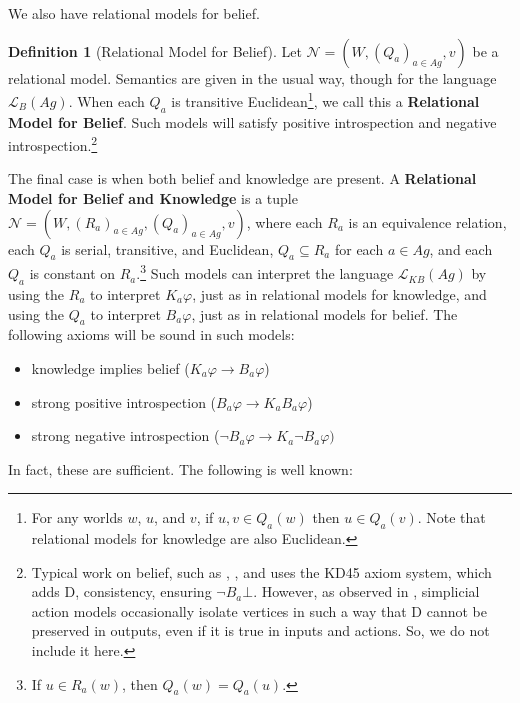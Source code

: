 \documentclass[11pt]{article}
\theoremstyle{definition}
\newtheorem{definition}{Definition}[section]
\newcommand{\defin}[1]{\textbf{#1}}
\renewcommand{\phi}{\varphi}
\newcommand{\lthen}{\rightarrow}
\renewcommand{\L}{\mathcal{L}}
\newcommand{\N}{\mathcal{N}}
\begin{document}
	We also have relational models for belief.
	
		\begin{definition}[Relational Model for Belief] Let $\N = (W,(Q_{a})_{a \in Ag},v)$ be a relational model. Semantics are given in the usual way, though for the language $\L_{B}(Ag)$. When each $Q_a$ is transitive Euclidean\footnote{For any worlds $w$, $u$, and $v$, if $u,v\in Q_a(w)$ then $u\in Q_a(v)$. Note that relational models for knowledge are also Euclidean.}, we call this a \defin{Relational Model for Belief}. Such models will satisfy positive introspection and negative introspection.\footnote{Typical work on belief, such as \cite{HGD}, \cite{SimpBel}, and \cite{BelSimp} uses the \textsf{KD45} axiom system, which adds \textsf{D}, consistency, ensuring $\neg B_a\bot$. However, as observed in \cite{SimpBelRev}, simplicial action models occasionally isolate vertices in such a way that \textsf{D} cannot be preserved in outputs, even if it is true in inputs and actions. So, we do not include it here.}
	\end{definition}

	The final case is when both belief and knowledge are present. A \defin{Relational Model for Belief and Knowledge} is a tuple $\N=(W,(R_{a})_{a \in Ag},(Q_{a})_{a \in Ag},v)$, where each $R_a$ is an equivalence relation, each $Q_a$ is serial, transitive, and Euclidean, $Q_a\subseteq R_a$ for each $a\in Ag$, and each $Q_a$ is constant on $R_a$.\footnote{If $u\in R_a(w)$, then $Q_a(w)=Q_a(u)$.} Such models can interpret the language $\L_{KB}(Ag)$ by using the $R_a$ to interpret $K_a\varphi$, just as in relational models for knowledge, and using the $Q_a$ to interpret $B_a\varphi$, just as in relational models for belief. The following axioms will be sound in such models:
	
	\begin{itemize}
	\item knowledge implies belief ($K_{a} \phi \lthen B_{a} \phi$)
	\item strong positive introspection ($B_{a} \phi \lthen K_{a} B_{a} \phi$)
	\item strong negative introspection ($\lnot B_{a} \phi \lthen K_{a} \lnot B_{a} \phi)$
	\end{itemize}

	In fact, these are sufficient. The following is well known: \cite{DC5, BelSimp,Bjorndahl2024}
	
\end{document}

